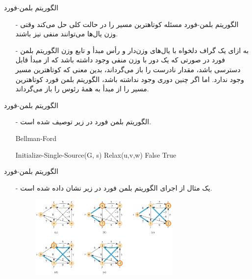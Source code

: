 
\begin{frame}{‌الگوریتم بلمن-فورد}
\begin{itemize}\itemr
\item[-]
الگوریتم بلمن-فورد
مسئله کوتاهترین مسیر را در حالت کلی حل می‌کند وقتی وزن یال‌ها می‌توانند منفی نیز باشند.
\item[-]
به ازای یک گراف دلخواه
با یال‌های وزن‌دار و رأس مبدأ
و تابع وزن
الگوریتم بلمن فورد در صورتی که یک دور با وزن منفی وجود داشته باشد که از مبدأ قابل دسترسی باشد، مقدار نادرست را باز می‌گرداند، بدین معنی که کوتاهترین مسیر وجود ندارد. اما اگر چنین دوری وجود نداشته باشد، الگوریتم بلمن فورد کوتاهترین مسیر را از مبدأ به همهٔ رئوس را باز می‌گرداند.
\end{itemize}
\end{frame}


\begin{frame}{‌الگوریتم بلمن-فورد}
\begin{itemize}\itemr
\item[-]
الگوریتم بلمن فورد در زیر توصیف شده است.
\begin{algorithm}[H]\alglr
  \caption{Bellman-Ford} 
  \begin{algorithmic}[1]
   \State Initialize-Single-Source(G, s)
   				\State Relax(u,v,w)
   		\EndFor
   	\EndFor
   					\State \Return False
   			\EndIf
   	\EndFor
   	\State \Return True                         
  \end{algorithmic}
  \label{alg:merge}
\end{algorithm}
\end{itemize}
\end{frame}


\begin{frame}{‌الگوریتم بلمن-فورد}
\begin{itemize}\itemr
\item[-]
یک مثال از اجرای الگوریتم بلمن فورد در زیر نشان داده شده است.
\begin{figure}
\includegraphics[width=0.7\textwidth]{figs/chap07/613-bellman}
\end{figure}
\end{itemize}
\end{frame}


